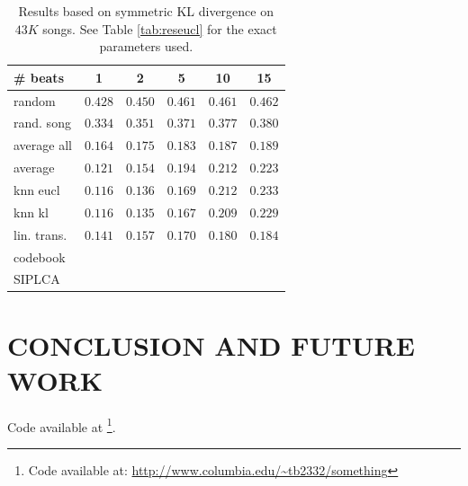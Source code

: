 \documentclass{article}
\begin{document}
\begin{table}[t]
\begin{small}
\begin{center}
\begin{tabular}{l|c|c|c|c|c|}
\# beats & 1 & 2 & 5 & 10 & 15 \\ \hline \hline
random & $0.428$ & $0.450$ & $0.461$ & $0.461$ & $0.462$  \\
rand. song & $0.334$ & $0.351$ & $0.371$ & $0.377$ & $0.380$  \\
average all & $0.164$ & $0.175$ & $0.183$ & $0.187$ & $0.189$ \\ 
average & $0.121$ & $0.154$ & $0.194$ & $0.212$ &  $0.223$ \\ \hline
knn eucl & $\mathbf{0.116}$ & $0.136$ & $0.169$ & $0.212$ & $0.233$ \\
knn kl & $\mathbf{0.116}$ & $\mathbf{0.135}$ & $\mathbf{0.167}$ & $0.209$ & $0.229$ \\
lin. trans. & $0.141$ & $0.157$ & $0.170$ & $\mathbf{0.180}$ & $\mathbf{0.184}$ \\
codebook & & & & &  \\
SIPLCA & & & & &  \\ \hline
\end{tabular}
\caption{Results based on symmetric KL divergence on $43K$ songs.
See Table \ref{tab:reseucl} for the exact parameters used.}
\label{tab:reskl}
\end{center}
\end{small}
\end{table}
\fi

\section{CONCLUSION AND FUTURE WORK}
\label{sec:conclusion}


Code available at \footnote{Code available at: \url{http://www.columbia.edu/~tb2332/something}}.





\end{document}
